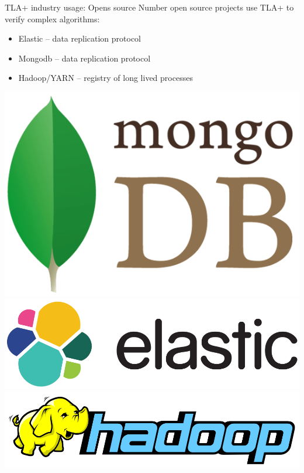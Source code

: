 \documentclass[12pt]{beamer}
\begin{document}
  \begin{frame}{TLA+ industry usage: Opens source}
      Number open source projects use TLA+ to verify complex algorithms:
    \begin{itemize}
        \item Elastic -- data replication protocol~\cite{elastic2017}
        \item Mongodb -- data replication protocol~\cite{mongo2016}
        \item Hadoop/YARN -- registry of long lived processes~\cite{hadoop2017}
    \end{itemize}
    \begin{center}
        \includegraphics[scale=0.1]{figures/mongo}
        \includegraphics[scale=0.12]{figures/elastic}
        \includegraphics[scale=0.14]{figures/hadoop}
    \end{center}
  \end{frame}
\end{document}
